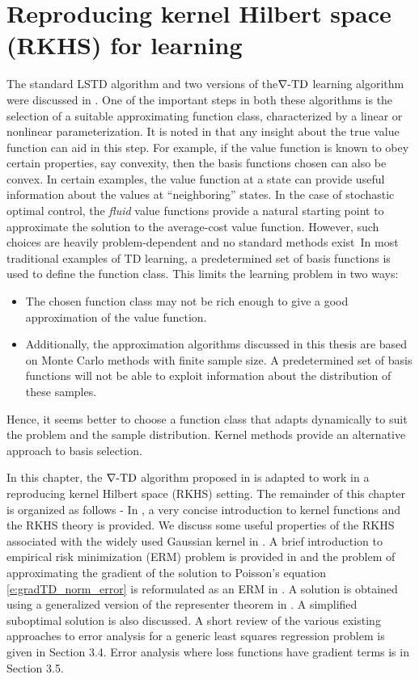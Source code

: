 \chapter{Reproducing kernel Hilbert space (RKHS) for learning}
\label{ch:rkhs}
The standard LSTD algorithm and two versions of the$\nabla\text{-TD}$ learning algorithm were discussed in . One of the important steps in both these algorithms is the selection of a suitable approximating function class, characterized by  a linear or nonlinear parameterization. It is noted in \cite{ctcn} that any insight about the true value function can aid in this step. For example, if the value function is known to obey certain properties, say convexity, then the basis functions chosen can also be convex.  In certain examples, the value function at a state can provide useful information about the values at ``neighboring'' states. In the case of stochastic optimal control, the \textit{fluid} value functions provide a natural starting point to approximate the solution to the average-cost value function. However, such choices are heavily problem-dependent and no standard methods exist\ In most traditional examples of TD learning, a predetermined set of basis functions is used to define the function class. This limits the learning problem in two ways:
\begin{itemize}
	\item The chosen function class may not be rich enough to give a good approximation of the value function.
	\item Additionally, the approximation algorithms discussed in this thesis are based on Monte Carlo methods with finite sample size. A predetermined set of basis functions will not be able to exploit information about the distribution of these samples.  
\end{itemize}
Hence, it seems better to choose a function class that adapts dynamically to suit the problem and the sample distribution. Kernel methods provide an alternative approach to basis selection. 

In this chapter, the $\nabla\text{-TD}$ algorithm proposed in  is adapted to work in a reproducing kernel Hilbert space (RKHS) setting.  The remainder of this chapter is organized as follows - In , a very concise introduction to kernel functions and the RKHS theory is provided. We discuss some useful properties of the RKHS associated with the widely used Gaussian kernel in . A brief introduction to empirical risk minimization (ERM) problem is provided in  and the problem of approximating the gradient of the solution to Poisson's equation \eqref{e:gradTD_norm_error} is reformulated as an ERM in . A solution is obtained using a generalized  version of the representer theorem in .  A simplified suboptimal solution is also discussed. A short review of the various existing approaches to error analysis for a generic least squares regression problem is given in  Section 3.4. %
Error analysis where loss functions have gradient terms is in Section 3.5.
 
